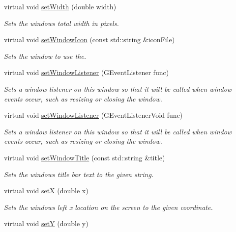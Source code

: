 \begin{DoxyCompactItemize}
virtual void \mbox{\hyperlink{classGWindow_aa3f3fba4cb131baa8696ba01e3bceca1}{set\+Width}} (double width)
\begin{DoxyCompactList}\small\item\em Sets the window\textquotesingle{}s total width in pixels. \end{DoxyCompactList}\item 
virtual void \mbox{\hyperlink{classGWindow_ab21f6abd314b7ffd3ccf7b6e18ac18cb}{set\+Window\+Icon}} (const std\+::string \&icon\+File)
\begin{DoxyCompactList}\small\item\em Sets the window to use the. \end{DoxyCompactList}\item 
virtual void \mbox{\hyperlink{classGWindow_adbb687462d07ac5bd49f3861e4356838}{set\+Window\+Listener}} (G\+Event\+Listener func)
\begin{DoxyCompactList}\small\item\em Sets a window listener on this window so that it will be called when window events occur, such as resizing or closing the window. \end{DoxyCompactList}\item 
virtual void \mbox{\hyperlink{classGWindow_a58b90463b205519917d5f68bdf068815}{set\+Window\+Listener}} (G\+Event\+Listener\+Void func)
\begin{DoxyCompactList}\small\item\em Sets a window listener on this window so that it will be called when window events occur, such as resizing or closing the window. \end{DoxyCompactList}\item 
virtual void \mbox{\hyperlink{classGWindow_a1c06b2b64d56394d6d77aa5b627910e2}{set\+Window\+Title}} (const std\+::string \&title)
\begin{DoxyCompactList}\small\item\em Sets the window\textquotesingle{}s title bar text to the given string. \end{DoxyCompactList}\item 
virtual void \mbox{\hyperlink{classGWindow_a9c18fcc579333bf9653d13ad2b372e39}{setX}} (double x)
\begin{DoxyCompactList}\small\item\em Sets the window\textquotesingle{}s left x location on the screen to the given coordinate. \end{DoxyCompactList}\item 
virtual void \mbox{\hyperlink{classGWindow_a7d57e2a5c35d27feb58fd498a3cf82b9}{setY}} (double y)

\end{DoxyCompactItemize}

